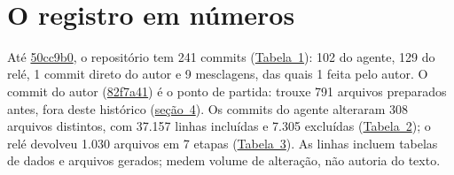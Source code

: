 \documentclass[12pt,a4paper]{article}
\begin{document}
\begin{table}[!htbp]
\begin{tabular}
\bottomrule
\addlinespace[2pt]
 \\
\end{tabular}
\end{table}

\section{O registro em números}\label{secao-3}

Até
\href{https://github.com/fcarva/aval-pol/commit/50cc9b02b42b52205f650eb6053f63a078e6a387}{50cc9b0},
o repositório tem 241 commits (\hyperref[tabela-1]{Tabela~1}): 102 do agente, 129 do relé, 1 commit direto do autor e 9
mesclagens, das quais 1 feita pelo autor. O commit do autor
(\href{https://github.com/fcarva/aval-pol/commit/82f7a41ce688ab6cc189c2df738e162078614635}{82f7a41})
é o ponto de partida: trouxe 791 arquivos preparados antes, fora deste histórico (\hyperref[secao-4]{seção~4}). Os
commits do agente alteraram 308 arquivos distintos, com 37.157 linhas incluídas e 7.305 excluídas
(\hyperref[tabela-2]{Tabela~2}); o relé devolveu 1.030 arquivos em 7 etapas (\hyperref[tabela-3]{Tabela~3}). As linhas incluem tabelas de
dados e arquivos gerados; medem volume de alteração, não autoria do texto.
\end{document}
